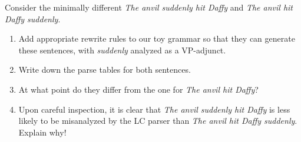 \begin{exercise}
    Consider the minimally different \emph{The anvil suddenly hit Daffy} and \emph{The anvil hit Daffy suddenly}.    
    \begin{enumerate}
        \item Add appropriate rewrite rules to our toy grammar so that they can generate these sentences, with \emph{suddenly} analyzed as a VP-adjunct.
        \item Write down the parse tables for both sentences.
        \item At what point do they differ from the one for \emph{The anvil hit Daffy}?
        \item Upon careful inspection, it is clear that \emph{The anvil suddenly hit Daffy} is less likely to be misanalyzed by the LC parser than \emph{The anvil hit Daffy suddenly}.
            Explain why!
    \end{enumerate}
\end{exercise}

